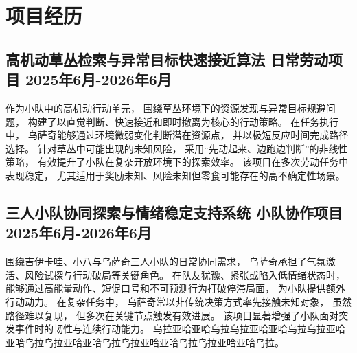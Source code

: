 \documentclass[10pt]{article}
\begin{document}

\section{
    \makebox[\widthof{\faGears}][c]{
        \color{CHU_Blue}{\faGears}
    }
    \quad
    项目经历
}


\subsection{
    高机动草丛检索与异常目标快速接近算法
    \hfill
    日常劳动项目
    \hfill
    2025年6月-2026年6月
}

\hspace*{1.5em}
作为小队中的高机动行动单元，
围绕草丛环境下的资源发现与异常目标规避问题，
构建了以直觉判断、快速接近和即时撤离为核心的行动策略。
在任务执行中，
乌萨奇能够通过环境微弱变化判断潜在资源点，
并以极短反应时间完成路径选择。
针对草丛中可能出现的未知风险，
采用“先动起来、边跑边判断”的非线性策略，
有效提升了小队在复杂开放环境下的探索效率。
该项目在多次劳动任务中表现稳定，
尤其适用于奖励未知、风险未知但零食可能存在的高不确定性场景。


\subsection{
    三人小队协同探索与情绪稳定支持系统
    \hfill
    小队协作项目
    \hfill
    2025年6月-2026年6月
}

\hspace*{1.5em}
围绕吉伊卡哇、小八与乌萨奇三人小队的日常协同需求，
乌萨奇承担了气氛激活、风险试探与行动破局等关键角色。
在队友犹豫、紧张或陷入低情绪状态时，
能够通过高能量动作、短促口号和不可预测行为打破停滞局面，
为小队提供额外行动动力。
在复杂任务中，
乌萨奇常以非传统决策方式率先接触未知对象，
虽然路径难以复现，
但多次在关键节点触发有效进展。
该项目显著增强了小队面对突发事件时的韧性与连续行动能力。
乌拉亚哈亚哈乌拉乌拉亚哈亚哈乌拉乌拉亚哈亚哈乌拉乌拉亚哈亚哈乌拉乌拉亚哈亚哈乌拉乌拉亚哈亚哈乌拉。

\end{document}
